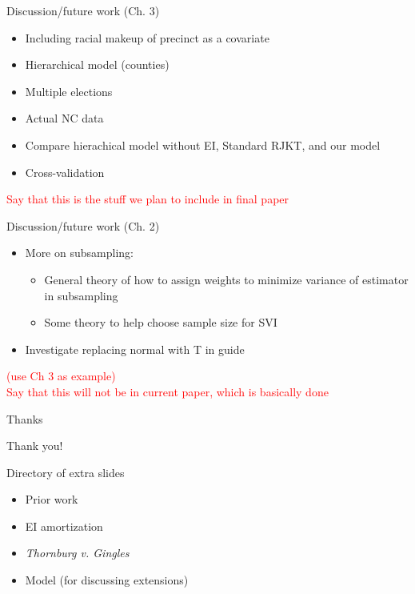 \documentclass[
  ignorenonframetext,
]{beamer}
\providecommand{\tightlist}{%
  \setlength{\itemsep}{0pt}\setlength{\parskip}{0pt}}
\begin{document}
\begin{frame}{Discussion/future work (Ch. 3)}
\protect\hypertarget{discussionfuture-work-ch.-3}{}

\begin{itemize}
\tightlist
\item
  Including racial makeup of precinct as a covariate
\item
  Hierarchical model (counties)
\item
  Multiple elections
\item
  Actual NC data
\item
  Compare hierachical model without EI, Standard RJKT, and our model
\item
  Cross-validation
\end{itemize}

\textcolor{red}{{\scriptsize Say that this is the stuff we plan to include in final paper}}

\end{frame}

\begin{frame}{Discussion/future work (Ch. 2)}
\protect\hypertarget{discussionfuture-work-ch.-2}{}

\begin{itemize}
\tightlist
\item
  More on subsampling:

  \begin{itemize}
  \tightlist
  \item
    General theory of how to assign weights to minimize variance of
    estimator in subsampling
  \item
    Some theory to help choose sample size for SVI
  \end{itemize}
\item
  Investigate replacing normal with T in guide
\end{itemize}

\textcolor{red}{{\scriptsize (use Ch 3 as example)\\Say that this will not be in current paper, which is basically done}}

\end{frame}

\begin{frame}{Thanks}
\protect\hypertarget{thanks}{}

Thank you!

\end{frame}

\begin{frame}{Directory of extra slides}
\protect\hypertarget{directory-of-extra-slides}{}

\begin{itemize}
\tightlist
\item
  Prior work
\item
  EI amortization
\item
  \emph{Thornburg v. Gingles}
\item
  Model (for discussing extensions)
\end{itemize}

\end{frame}
\end{document}

